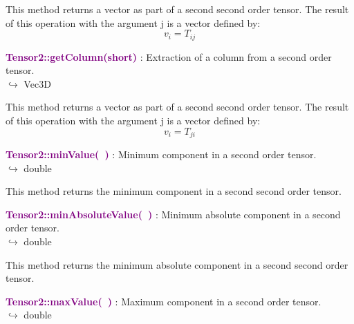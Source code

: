 This method returns a vector as part of a second second order tensor.
The result of this operation with the argument j is a vector defined by:
\begin{equation*}
v_{i} = T_{ij}
\end{equation*}

\textcolor{purple}{\textbf{Tensor2::getColumn(short)}}\label{Tensor2::getColumn(short)} : Extraction of a column from a second order tensor.\\ \hspace*{5mm}$\hookrightarrow$ Vec3D

This method returns a vector as part of a second second order tensor.
The result of this operation with the argument j is a vector defined by:
\begin{equation*}
v_{i} = T_{ji}
\end{equation*}

\textcolor{purple}{\textbf{Tensor2::minValue(~)}}\label{Tensor2::minValue()} : Minimum component in a second order tensor.\\ \hspace*{5mm}$\hookrightarrow$ double

This method returns the minimum component in a second second order tensor.

\textcolor{purple}{\textbf{Tensor2::minAbsoluteValue(~)}}\label{Tensor2::minAbsoluteValue()} : Minimum absolute component in a second order tensor.\\ \hspace*{5mm}$\hookrightarrow$ double

This method returns the minimum absolute component in a second second order tensor.

\textcolor{purple}{\textbf{Tensor2::maxValue(~)}}\label{Tensor2::maxValue()} : Maximum component in a second order tensor.\\ \hspace*{5mm}$\hookrightarrow$ double

